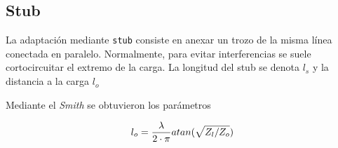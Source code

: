 \subsection{Stub}

La adaptación mediante \texttt{stub} consiste en anexar un trozo de la misma línea conectada en paralelo. Normalmente, para evitar interferencias se suele cortocircuitar el extremo de la carga. La longitud del stub se denota $l_s$ y la distancia a la carga $l_o$




Mediante el \textit{Smith} se obtuvieron los parámetros

\begin{equation}
	\centering
	l_o = \frac{\lambda}{2 \cdot \pi} atan(\sqrt{Z_l / Z_o})
\end{equation}


